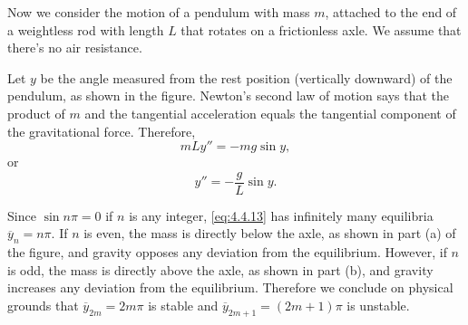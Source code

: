 \documentclass{ximera}
\begin{document}
\begin{example}\label{example:4.4.2}
Now we
consider the motion of a pendulum with mass $m$, attached to the end
of a weightless rod with length $L$ that rotates on a frictionless
axle. We assume that there's no air
resistance.

\begin{center}
\end{center}
 
 
 
Let $y$ be the angle measured from the rest position
(vertically downward) of the pendulum, as shown in
the figure. Newton's second law of motion says that the
product of $m$ and the tangential acceleration equals the tangential
component of the gravitational force.  Therefore,
$$
mLy''=-mg\sin y,
$$
or
\begin{equation} \label{eq:4.4.13}
y''=-\frac{g}{L} \sin y.
\end{equation}
 
 
Since $\sin n\pi=0$ if $n$ is any integer,  \eqref{eq:4.4.13} has
infinitely many equilibria $\overline{y}_n=n\pi$. If $n$ is
even, the mass is directly below the axle, as shown in part (a) of the figure, and gravity opposes any deviation
from the equilibrium. However, if $n$ is odd, the mass is directly
above the axle, as shown in part (b), and gravity
increases any deviation from the equilibrium. Therefore we conclude
on physical grounds that $\overline{y}_{2m}=2m\pi$ is stable and
$\overline{y}_{2m+1}=(2m+1)\pi$ is unstable.

\begin{center}
\end{center} 
 

\end{example}
\end{document}
